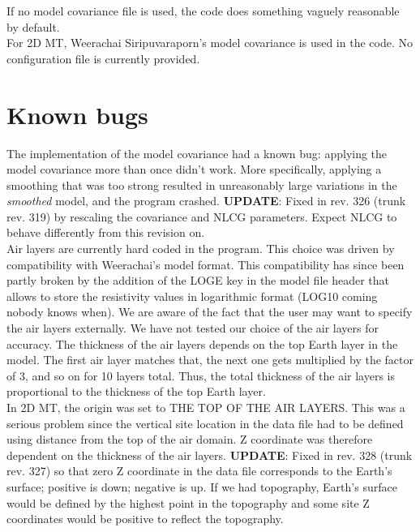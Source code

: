 \documentclass[12pt]{article}
\begin{document}
If no model covariance file is used, the code does something vaguely reasonable by default.\\

For 2D MT, Weerachai Siripuvaraporn's model covariance is used in the code. No configuration file is currently provided.\\


\section{Known bugs}

The implementation of the model covariance had a known bug: applying the model covariance more than once didn't work. More specifically, applying a smoothing that was too strong resulted in unreasonably large variations in the \emph{smoothed} model, and the program crashed. \textbf{UPDATE}: Fixed in rev. 326 (trunk rev. 319) by rescaling the covariance and NLCG parameters. Expect NLCG to behave differently from this revision on.\\

Air layers are currently hard coded in the program. This choice was driven by compatibility with Weerachai's model format. This compatibility has since been partly broken by the addition of the LOGE key in the model file header that allows to store the resistivity values in logarithmic format (LOG10 coming nobody knows when). We are aware of the fact that the user may want to specify the air layers externally. We have not tested our choice of the air layers for accuracy. The thickness of the air layers depends on the top Earth layer in the model. The first air layer matches that, the next one gets multiplied by the factor of 3, and so on for 10 layers total. Thus, the total thickness of the air layers is proportional to the thickness of the top Earth layer.\\

In 2D MT, the origin was set to THE TOP OF THE AIR LAYERS. This was a serious problem since the vertical site location in the data file had to be defined using distance from the top of the air domain. Z coordinate was therefore dependent on the thickness of the air layers. \textbf{UPDATE}: Fixed in rev. 328 (trunk rev. 327) so that zero Z coordinate in the data file corresponds to the Earth's surface; positive is down; negative is up. If we had topography, Earth's surface would be defined by the highest point in the topography and some site Z coordinates would be positive to reflect the topography.\\
\end{document}
